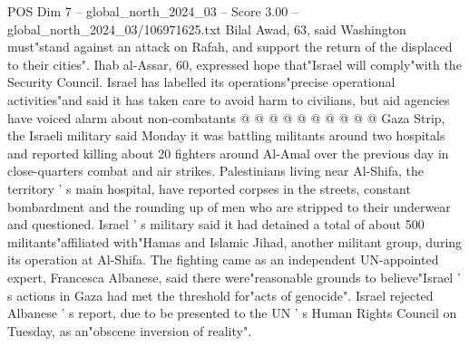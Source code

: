 \begin{textsample}{POS Dim 7 – global\_north\_2024\_03 – Score 3.00 – global\_north\_2024\_03/106971625.txt}
Bilal Awad, 63, said Washington must"stand against an attack on Rafah, and support the return of the displaced to their cities".
Ihab al-Assar, 60, expressed hope that"Israel will comply"with the Security Council.
Israel has labelled its operations"precise operational activities"and said it has taken care to avoid harm to civilians, but aid agencies have voiced alarm about non-combatants @ @ @ @ @ @ @ @ @ @ Gaza Strip, the Israeli military said Monday it was battling militants around two hospitals and reported killing about 20 fighters around Al-Amal over the previous day in close-quarters combat and air strikes.
Palestinians living near Al-Shifa, the territory ' s main hospital, have reported corpses in the streets, constant bombardment and the rounding up of men who are stripped to their underwear and questioned.
Israel ' s military said it had detained a total of about 500 militants"affiliated with"Hamas and Islamic Jihad, another militant group, during its operation at Al-Shifa.
The fighting came as an independent UN-appointed expert, Francesca Albanese, said there were"reasonable grounds to believe"Israel ' s actions in Gaza had met the threshold for"acts of genocide".
Israel rejected Albanese ' s report, due to be presented to the UN ' s Human Rights Council on Tuesday, as an"obscene inversion of reality".

\end{textsample}
